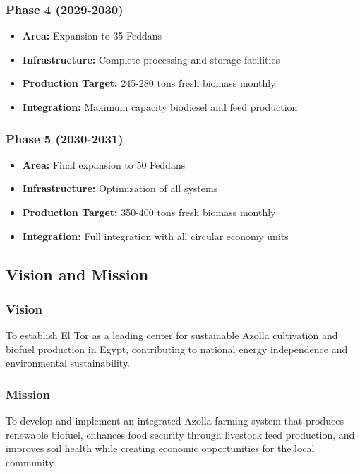 \subsubsection{Phase 4 (2029-2030)}
\begin{itemize}
    \item \textbf{Area:} Expansion to 35 Feddans
    \item \textbf{Infrastructure:} Complete processing and storage facilities
    \item \textbf{Production Target:} 245-280 tons fresh biomass monthly
    \item \textbf{Integration:} Maximum capacity biodiesel and feed production
\end{itemize}

\subsubsection{Phase 5 (2030-2031)}
\begin{itemize}
    \item \textbf{Area:} Final expansion to 50 Feddans
    \item \textbf{Infrastructure:} Optimization of all systems
    \item \textbf{Production Target:} 350-400 tons fresh biomass monthly
    \item \textbf{Integration:} Full integration with all circular economy units
\end{itemize}


\subsection{Vision and Mission}

\subsubsection{Vision}
To establish El Tor as a leading center for sustainable Azolla cultivation and biofuel production in Egypt, contributing to national energy independence and environmental sustainability.

\subsubsection{Mission}
To develop and implement an integrated Azolla farming system that produces renewable biofuel, enhances food security through livestock feed production, and improves soil health while creating economic opportunities for the local community.

